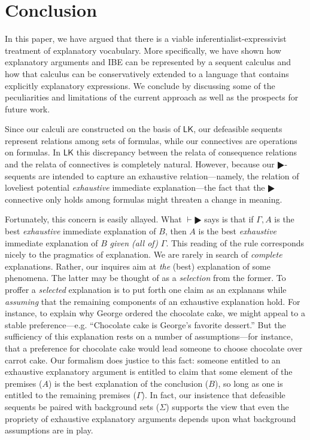 \documentclass{article}
\theoremstyle{definition}
\theoremstyle{definition}
\theoremstyle{definition}
\theoremstyle{definition}
\theoremstyle{remark}
\theoremstyle{definition}
\theoremstyle{definition}
\begin{document}
\section{Conclusion}

In this paper, we have argued that there is a viable inferentialist-expressivist treatment of explanatory vocabulary. More specifically, we have shown how explanatory arguments and IBE can be represented by a sequent calculus and how that calculus can be conservatively extended to a language that contains explicitly explanatory expressions. We conclude by discussing some of the peculiarities and limitations of the current approach as well as the prospects for future work.

Since our calculi are constructed on the basis of $ \mathsf{LK} $,  our defeasible sequents represent relations among sets of formulas, while our connectives are operations on formulas. In $ \mathsf{LK}$ this discrepancy between the relata of consequence relations and the relata of connectives is completely natural. However, because our $ \RHD $-sequents are intended to capture an exhaustive relation---namely, the relation of loveliest potential \textit{exhaustive} immediate explanation---the fact that the $ \RHD $ connective only holds among formulas might threaten a change in meaning.

 Fortunately, this concern is easily allayed. What $ \vdash\RHD $ says is that if $ \Gamma, A $ is the best \textit{exhaustive} immediate explanation of $ B $, then $ A $ is the best \textit{exhaustive} immediate explanation of $ B $ \textit{given (all of)} $ \Gamma$. This reading of the rule corresponds nicely to the pragmatics of explanation. We are rarely in search of \textit{complete} explanations. Rather, our inquires aim at \textit{the} (best) explanation of some phenomena. The latter may be thought of as a \textit{selection} from the former.  To proffer a \textit{selected} explanation is to put forth one claim as an explanans while \textit{assuming} that the remaining components of an exhaustive explanation hold. For instance,  to explain why George ordered the chocolate cake, we might appeal to a stable preference---e.g. ``Chocolate cake is George's favorite dessert.'' But the sufficiency of this explanation rests on a number of assumptions---for instance, that a preference for chocolate cake would lead someone to choose chocolate over carrot cake. Our formalism does justice to this fact:  someone entitled to an exhaustive explanatory argument is entitled to claim that some element of the premises  ($ A$) is the best explanation of the conclusion ($ B $), so long as one is entitled to the remaining premises ($ \Gamma $). In fact, our insistence that defeasible sequents be paired with background sets ($ \Sigma $) supports the view that even the propriety of exhaustive explanatory arguments depends upon what background assumptions are in play.
 
\end{document}

